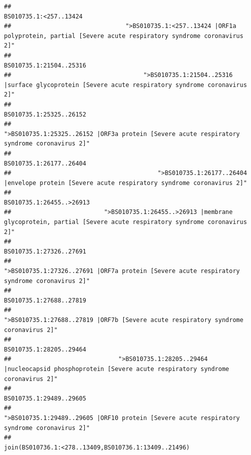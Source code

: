 \documentclass[
]{article}
\begin{document}
\begin{verbatim}
##                                                                                                                 BS010735.1:<257..13424 
##                                ">BS010735.1:<257..13424 |ORF1a polyprotein, partial [Severe acute respiratory syndrome coronavirus 2]" 
##                                                                                                                BS010735.1:21504..25316 
##                                     ">BS010735.1:21504..25316 |surface glycoprotein [Severe acute respiratory syndrome coronavirus 2]" 
##                                                                                                                BS010735.1:25325..26152 
##                                            ">BS010735.1:25325..26152 |ORF3a protein [Severe acute respiratory syndrome coronavirus 2]" 
##                                                                                                                BS010735.1:26177..26404 
##                                         ">BS010735.1:26177..26404 |envelope protein [Severe acute respiratory syndrome coronavirus 2]" 
##                                                                                                               BS010735.1:26455..>26913 
##                          ">BS010735.1:26455..>26913 |membrane glycoprotein, partial [Severe acute respiratory syndrome coronavirus 2]" 
##                                                                                                                BS010735.1:27326..27691 
##                                            ">BS010735.1:27326..27691 |ORF7a protein [Severe acute respiratory syndrome coronavirus 2]" 
##                                                                                                                BS010735.1:27688..27819 
##                                                    ">BS010735.1:27688..27819 |ORF7b [Severe acute respiratory syndrome coronavirus 2]" 
##                                                                                                                BS010735.1:28205..29464 
##                              ">BS010735.1:28205..29464 |nucleocapsid phosphoprotein [Severe acute respiratory syndrome coronavirus 2]" 
##                                                                                                                BS010735.1:29489..29605 
##                                            ">BS010735.1:29489..29605 |ORF10 protein [Severe acute respiratory syndrome coronavirus 2]" 
##                                                                                   join(BS010736.1:<278..13409,BS010736.1:13409..21496) 

\end{verbatim}
\end{document}
